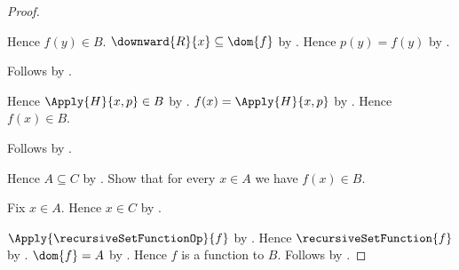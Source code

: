 \begin{proof}
\begin{subproof}
\begin{subproof}
\begin{subproof}
\begin{subproof}
                    Hence $f(y)\in B$.
                    $\downward{R}{x}\subseteq\dom{f}$ by
                        .
                    Hence $p(y)=f(y)$ by
                        .
                \end{subproof}
                Follows by .
            \end{subproof}
            Hence $\Apply{H}{x,p}\in B$ by
                .
            $f(x)=\Apply{H}{x,p}$ by
                .
            Hence $f(x)\in B$.
        \end{subproof}
        Follows by .
    \end{subproof}
    Hence $A\subseteq C$ by .
    Show that for every $x\in A$ we have $f(x)\in B$.
    \begin{subproof}
        Fix $x\in A$.
        Hence $x\in C$ by .
    \end{subproof}
    $\Apply{\recursiveSetFunctionOp}{f}$ by
        .
    Hence $\recursiveSetFunction{f}$ by
        .
    $\dom{f}=A$ by
        .
    Hence $f$ is a function to $B$.
    Follows by .
\end{proof}
